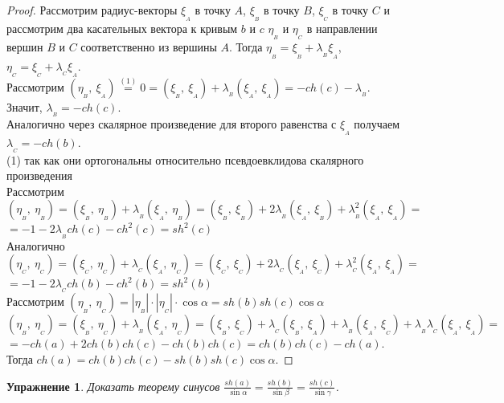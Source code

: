 \documentclass[12pt]{article}
\theoremstyle{plain}
\newtheorem*{exercise}{Упражнение}
\begin{document}
    \begin{proof}
        Рассмотрим радиус-векторы $\xi_{_A}$ в точку $A$, $\xi_{_B}$ в точку $B$, $\xi_{_C}$ в точку $C$ и рассмотрим два касательных вектора к кривым $b$ и $c$ $\eta_{_B}$ и $\eta_{_C}$ в направлении вершин $B$ и $C$ соответственно из вершины $A$. Тогда $\eta_{_B}=\xi_{_B}+\lambda_{_B}\xi_{_A}$, $\eta_{_C}=\xi_{_C}+\lambda_{_C}\xi_{_A}$.\\
        Рассмотрим $\left(\eta_{_B}, \ \xi_{_A}\right)\overset{(1)}{=}0=\left(\xi_{_B}, \ \xi_{_A}\right)+\lambda_{_B}\left(\xi_{_A}, \ \xi_{_A}\right)=-ch(c)-\lambda_{_B}$.\\
        Значит, $\lambda_{_B}=-ch(c)$.\\
        Аналогично через скалярное произведение для второго равенства с $\xi_{_A}$ получаем $\lambda_{_C}=-ch(b)$.\\
        (1) так как они ортогональны относительно псевдоевклидова скалярного произведения\\
        Рассмотрим $\left(\eta_{_B}, \ \eta_{_B}\right)=\left(\xi_{_B}, \ \eta_{_B}\right)+\lambda_{_B}\left(\xi_{_A}, \ \eta_{_B}\right)=\left(\xi_{_B}, \ \xi_{_B}\right)+2\lambda_{_B}\left(\xi_{_A}, \ \xi_{_B}\right)+\lambda_{_B}^2\left(\xi_{_A}, \ \xi_{_A}\right)=$\\
        $=-1-2\lambda_{_B}ch(c)-ch^2(c)=sh^2(c)$\\
        Аналогично $\left(\eta_{_C}, \ \eta_{_C}\right)=\left(\xi_{_C}, \ \eta_{_C}\right)+\lambda_{_C}\left(\xi_{_A}, \ \eta_{_C}\right)=\left(\xi_{_C}, \ \xi_{_C}\right)+2\lambda_{_C}\left(\xi_{_A}, \ \xi_{_C}\right)+\lambda_{_C}^2\left(\xi_{_A}, \ \xi_{_A}\right)=$\\
        $=-1-2\lambda_{_C}ch(b)-ch^2(b)=sh^2(b)$\\
        Рассмотрим $\left(\eta_{_B}, \ \eta_{_C}\right)=|\eta_{_B}|\cdot|\eta_{_C}|\cdot\cos\alpha=sh(b)sh(c)\cos\alpha$\\
        $\left(\eta_{_B}, \ \eta_{_C}\right)=\left(\xi_{_B}, \ \eta_{_C}\right)+\lambda_{_B}\left(\xi_{_A}, \ \eta_{_C}\right)=\left(\xi_{_B}, \ \xi_{_C}\right)+\lambda_{_C}\left(\xi_{_B}, \ \xi_{_A}\right)+\lambda_{_B}\left(\xi_{_A}, \ \xi_{_C}\right)+\lambda_{_B}\lambda_{_C}\left(\xi_{_A}, \ \xi_{_A}\right)=$\\
        $=-ch(a)+2ch(b)ch(c)-ch(b)ch(c)=ch(b)ch(c)-ch(a)$.\\
        Тогда $ch(a)=ch(b)ch(c)-sh(b)sh(c)\cos\alpha$.
    \end{proof}
    \begin{exercise}
        Доказать теорему синусов $\frac{sh(a)}{\sin\alpha}=\frac{sh(b)}{\sin\beta}=\frac{sh(c)}{\sin\gamma}$.
    \end{exercise}
\end{document}
